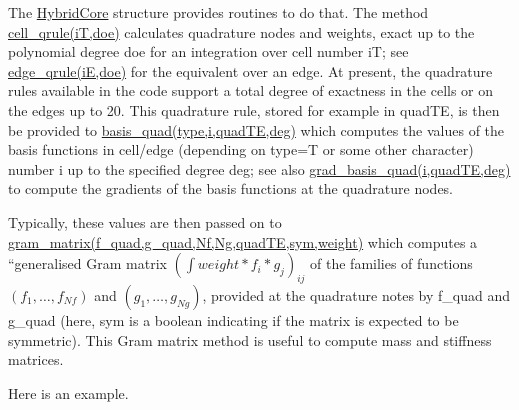 The \hyperlink{classHArDCore2D_1_1HybridCore}{Hybrid\+Core} structure provides routines to do that. The method \hyperlink{classHArDCore2D_1_1HybridCore_a5d70dcda8d8a56311b2d1eac4f7d306c}{cell\+\_\+qrule(iT,doe)} calculates quadrature nodes and weights, exact up to the polynomial degree {\ttfamily doe} for an integration over cell number {\ttfamily iT}; see \hyperlink{classHArDCore2D_1_1HybridCore_a4158e234143fd956fd4038adf9097bc2}{edge\+\_\+qrule(iE,doe)} for the equivalent over an edge. At present, the quadrature rules available in the code support a total degree of exactness in the cells or on the edges up to 20. This quadrature rule, stored for example in {\ttfamily quad\+TE}, is then be provided to \hyperlink{classHArDCore2D_1_1HybridCore_acf453b4f239a76fe7f21b02ac91e127c}{basis\+\_\+quad(type,i,quad\+TE,deg)} which computes the values of the basis functions in cell/edge (depending on {\ttfamily type}=T or some other character) number {\ttfamily i} up to the specified degree {\ttfamily deg}; see also \hyperlink{classHArDCore2D_1_1HybridCore_add794287f4bb49157a7b5f94a5ecb200}{grad\+\_\+basis\+\_\+quad(i,quad\+TE,deg)} to compute the gradients of the basis functions at the quadrature nodes.

Typically, these values are then passed on to \hyperlink{classHArDCore2D_1_1HybridCore_aa5c203c11a661933930a33335b0e2479}{gram\+\_\+matrix(f\+\_\+quad,g\+\_\+quad,Nf,Ng,quad\+TE,sym,weight)} which computes a ``generalised\textquotesingle{}\textquotesingle{} Gram matrix $(\int weight*f_i*g_j)_{ij}$ of the families of functions $(f_1,\ldots,f_{Nf})$ and $(g_1,\ldots,g_{Ng})$, provided at the quadrature notes by {\ttfamily f\+\_\+quad} and {\ttfamily g\+\_\+quad} (here, {\ttfamily sym} is a boolean indicating if the matrix is expected to be symmetric). This Gram matrix method is useful to compute mass and stiffness matrices.

Here is an example.


